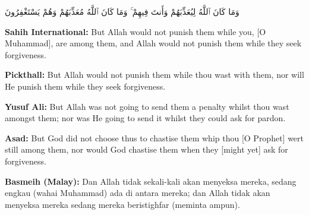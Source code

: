 \documentclass[11pt,a4paper,openany]{book}
\let\textAR\textarabic
\newcommand{\quranverse}[1]{{\centering\Large\textAR{#1}\par}}
\begin{document}
\begin{quranbox}[Qur'an 8:33]
\quranverse{وَمَا كَانَ ٱللَّهُ لِيُعَذِّبَهُمْ وَأَنتَ فِيهِمْ ۚ وَمَا كَانَ ٱللَّهُ مُعَذِّبَهُمْ وَهُمْ يَسْتَغْفِرُونَ}

\vspace{6pt}
\noindent\textbf{Sahih International:} But Allah would not punish them while you, [O Muhammad], are among them, and Allah would not punish them while they seek forgiveness.

\vspace{4pt}
\noindent\textbf{Pickthall:} But Allah would not punish them while thou wast with them, nor will He punish them while they seek forgiveness.

\vspace{4pt}
\noindent\textbf{Yusuf Ali:} But Allah was not going to send them a penalty whilst thou wast amongst them; nor was He going to send it whilst they could ask for pardon.

\vspace{4pt}
\noindent\textbf{Asad:} But God did not choose thus to chastise them whip thou [O Prophet] wert still among them, nor would God chastise them when they [might yet] ask for forgiveness.

\vspace{4pt}
\noindent\textbf{Basmeih (Malay):} Dan Allah tidak sekali-kali akan menyeksa mereka, sedang engkau (wahai Muhammad) ada di antara mereka; dan Allah tidak akan menyeksa mereka sedang mereka beristighfar (meminta ampun).
\end{quranbox}
\end{document}
